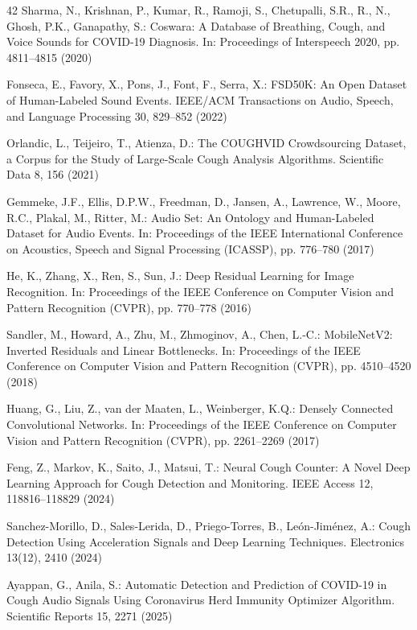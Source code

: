 \documentclass[pdflatex,sn-mathphys-num]{sn-jnl}
\begin{document}
\begin{thebibliography}{42}
Sharma, N., Krishnan, P., Kumar, R., Ramoji, S., Chetupalli, S.R., R., N., Ghosh, P.K., Ganapathy, S.: Coswara: A Database of Breathing, Cough, and Voice Sounds for COVID-19 Diagnosis. In: Proceedings of Interspeech 2020, pp. 4811–4815 (2020)

Fonseca, E., Favory, X., Pons, J., Font, F., Serra, X.: FSD50K: An Open Dataset of Human-Labeled Sound Events. IEEE/ACM Transactions on Audio, Speech, and Language Processing 30, 829–852 (2022)

Orlandic, L., Teijeiro, T., Atienza, D.: The COUGHVID Crowdsourcing Dataset, a Corpus for the Study of Large-Scale Cough Analysis Algorithms. Scientific Data 8, 156 (2021)

Gemmeke, J.F., Ellis, D.P.W., Freedman, D., Jansen, A., Lawrence, W., Moore, R.C., Plakal, M., Ritter, M.: Audio Set: An Ontology and Human-Labeled Dataset for Audio Events. In: Proceedings of the IEEE International Conference on Acoustics, Speech and Signal Processing (ICASSP), pp. 776–780 (2017)

He, K., Zhang, X., Ren, S., Sun, J.: Deep Residual Learning for Image Recognition. In: Proceedings of the IEEE Conference on Computer Vision and Pattern Recognition (CVPR), pp. 770–778 (2016)

Sandler, M., Howard, A., Zhu, M., Zhmoginov, A., Chen, L.-C.: MobileNetV2: Inverted Residuals and Linear Bottlenecks. In: Proceedings of the IEEE Conference on Computer Vision and Pattern Recognition (CVPR), pp. 4510–4520 (2018)

Huang, G., Liu, Z., van der Maaten, L., Weinberger, K.Q.: Densely Connected Convolutional Networks. In: Proceedings of the IEEE Conference on Computer Vision and Pattern Recognition (CVPR), pp. 2261–2269 (2017)

Feng, Z., Markov, K., Saito, J., Matsui, T.: Neural Cough Counter: A Novel Deep Learning Approach for Cough Detection and Monitoring. IEEE Access 12, 118816–118829 (2024)

Sanchez-Morillo, D., Sales-Lerida, D., Priego-Torres, B., Le{\'o}n-Jim{\'e}nez, A.: Cough Detection Using Acceleration Signals and Deep Learning Techniques. Electronics 13(12), 2410 (2024)

Ayappan, G., Anila, S.: Automatic Detection and Prediction of COVID-19 in Cough Audio Signals Using Coronavirus Herd Immunity Optimizer Algorithm. Scientific Reports 15, 2271 (2025)


\end{thebibliography}
\end{document}
